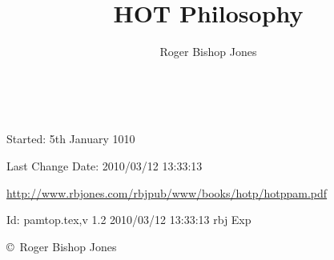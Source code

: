 \documentclass[10pt,a4paper.titlepage,openany,twocolumn]{book}
\author{Roger Bishop Jones}
\title{HOT Philosophy}
\date{\ }
\begin{document}
\frontmatter

\begin{titlepage}
\maketitle

\vfill

\begin{centering}

{\footnotesize

Started: 5th January 1010

Last Change $ $Date: 2010/03/12 13:33:13 $ $

\href{http://www.rbjones.com/rbjpub/www/books/hotp/hotppam.pdf}
{http://www.rbjones.com/rbjpub/www/books/hotp/hotppam.pdf}

$ $Id: pamtop.tex,v 1.2 2010/03/12 13:33:13 rbj Exp $ $

\copyright\ Roger Bishop Jones

}%

\end{centering}

\thispagestyle{empty}
\end{titlepage}

\onecolumn

{\parskip=0pt\tableofcontents}

\vfill

\pagebreak

\twocolumn
\end{document}

